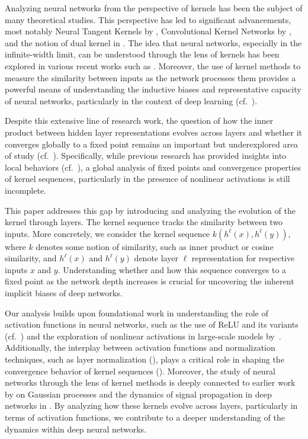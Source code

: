 \documentclass[twoside]{article}
\theoremstyle{definition}
\begin{document}
Analyzing neural networks from the perspective of kernels has been the subject of many theoretical studies. This perspective has led to significant advancements, most notably Neural Tangent Kernels by \citet{jacot2018neural}, Convolutional Kernel Networks by \citet{mairal2014convolutional}, and the notion of dual kernel in \citet{daniely2016toward}. The idea that neural networks, especially in the infinite-width limit, can be understood through the lens of kernels has been explored in various recent works such as \citet{lee2019wide, arora2019exact, yang2019scaling}. Moreover, the use of kernel methods to measure the similarity between inputs as the network processes them provides a powerful means of understanding the inductive biases and representative capacity of neural networks, particularly in the context of deep learning (cf.~\citet{zhang2017understanding,zhang2021understanding,cho2009kernel}).

Despite this extensive line of research work, the question of how the inner product between hidden layer representations evolves across layers and whether it converges globally to a fixed point remains an important but underexplored area of study (cf.~\citet{saxe2013exact, schoenholz2016deep, pennington2018emergence}). Specifically, while previous research has provided insights into local behaviors (cf.~\citet{yang2019meanfield}), a global analysis of fixed points and convergence properties of kernel sequences, particularly in the presence of nonlinear activations is still incomplete.

This paper addresses this gap by introducing and analyzing the evolution of the kernel through layers. The kernel sequence tracks the similarity between two inputs. More concretely, we consider the kernel sequence $k(h^\ell(x), h^\ell(y)),$ where $k$ denotes some notion of similarity, such as inner product or cosine similarity, and $h^\ell(x)$ and $h^\ell(y)$ denote layer $\ell$ representation for respective inputs $x$ and $y$. Understanding whether and how this sequence converges to a fixed point as the network depth increases is crucial for uncovering the inherent implicit biases of deep networks.

Our analysis builds upon foundational work in understanding the role of activation functions in neural networks, such as the use of ReLU and its variants (cf.~\citet{glorot2011deep, nair2010rectified}) and the exploration of nonlinear activations in large-scale models by~\citet{ramachandran2017searching, clevert2015fast}. Additionally, the interplay between activation functions and normalization techniques, such as layer normalization (\citet{ba2016layer}), plays a critical role in shaping the convergence behavior of kernel sequences (\citet{klambauer2017self, hayou2019impact}). Moreover, the study of neural networks through the lens of kernel methods is deeply connected to earlier work by \citet{williams2006gaussian} on Gaussian processes and the dynamics of signal propagation in deep networks in \citet{poole2016exponential, raghu2017expressive}. By analyzing how these kernels evolve across layers, particularly in terms of activation functions, we contribute to a deeper understanding of the dynamics within deep neural networks.
\end{document}
